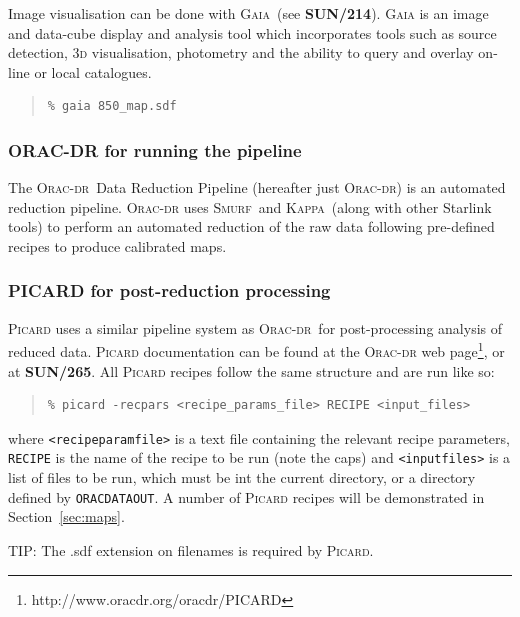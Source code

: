 \documentclass[twoside,11pt]{article}
\newcommand{\htmladdnormallinkfoot}[2]{#1\footnote{#2}}
\newcommand{\htmladdnormallink}[2]{#1}
\newcommand{\htmlref}[2]{#1}
\newenvironment{latexonly}{}{}
\newcommand{\latexhtml}[2]{#1}
\newcommand{\xref}[3]{#1}
\renewcommand{\_}{\texttt{\symbol{95}}}
\newenvironment{fmpage}[1]{\begin{lrbox}{\fmbox}\begin{minipage}{#1}}{\end{minipage}\end{lrbox}\fbox{\usebox{\fmbox}}}
\newenvironment{myquote}{\begin{quote}\begin{small}}{\end{small}\end{quote}}
\newcommand{\gaia}{\xref{\textsc{Gaia}}{sun214}{}}
\newcommand{\Kappa}{\xref{\textsc{Kappa}}{sun95}{}}
\newcommand{\oracdr}{\htmladdnormallink{\textsc{Orac-dr}}{http://www.oracdr.org/oracdr}}
\newcommand{\smurf}{\xref{\textsc{Smurf}}{sun258}{}}
\newcommand{\param}[1]{\texttt{#1}}
\newcommand{\gaiasun}{\xref{\textbf{SUN/214}}{sun214}{}}
\newcommand{\picardsun}{\xref{\textbf{SUN/265}}{sun265}{}}
\newcommand{\cref}[3]{\latexhtml{#1~\ref{#2}}{\htmlref{#3}{#2}}}
\begin{document}
Image visualisation can be done with \gaia\ (see \gaiasun). \textsc{Gaia} is an
image and data-cube display and analysis tool which incorporates tools such
as source detection, 3\textsc{d} visualisation, photometry and the ability
to query and overlay on-line or local catalogues.
\begin{myquote}
\begin{verbatim}
% gaia 850_map.sdf
\end{verbatim}
\end{myquote}

\subsubsection{ORAC-DR for running the pipeline}

The \oracdr\ Data Reduction Pipeline \cite{oracdr} (hereafter just
\textsc{Orac-dr}) is an automated reduction pipeline. \textsc{Orac-dr} uses
\smurf\ and \Kappa\ (along with other Starlink tools) to perform an automated
reduction of the raw data following pre-defined recipes to produce
calibrated maps.

\subsubsection{PICARD for post-reduction processing}

\textsc{Picard} uses a similar pipeline system as \oracdr\ for
post-processing analysis of reduced data. \textsc{Picard}
documentation can be found at \htmladdnormallinkfoot{the
\textsc{Orac-dr} web page}{http://www.oracdr.org/oracdr/PICARD}, or at
\picardsun. All \textsc{Picard} recipes follow the same structure and
are run like so:
\begin{myquote}
\begin{verbatim}
% picard -recpars <recipe_params_file> RECIPE <input_files>
\end{verbatim}
\end{myquote}
where \param{<recipe\_param\_file>} is a text file containing the
relevant recipe parameters, \param{RECIPE} is the name of the recipe
to be run (note the caps) and \param{<input\_files>} is a list of
files to be run, which must be int the current directory, or a
directory defined by \param{ORAC\_DATA\_OUT}. A number of \textsc{Picard}
recipes will be demonstrated in \cref{Section}{sec:maps}{Reducing your data}.


\begin{latexonly}
\begin{center}
\begin{fmpage}{0.95\linewidth}
\vspace{0.1cm}
TIP: The .sdf extension on filenames is required by \textsc{Picard}.
\end{fmpage}
\end{center}
\end{latexonly}
\end{document}
